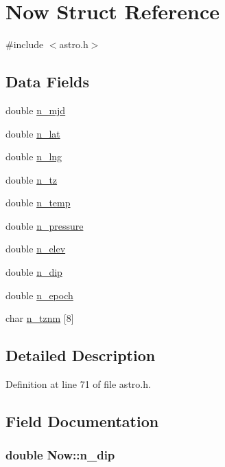 \hypertarget{struct_now}{\section{Now Struct Reference}
\label{struct_now}
}


{\ttfamily \#include $<$astro.\-h$>$}

\subsection*{Data Fields}
\begin{DoxyCompactItemize}
\item 
double \hyperlink{struct_now_ae44989148c84e000810e7e8a4ef80ef3}{n\-\_\-mjd}
\item 
double \hyperlink{struct_now_aa5502c245b6c3692923dcd93d63dcda7}{n\-\_\-lat}
\item 
double \hyperlink{struct_now_ae87a9736998420f40706b01a26f057aa}{n\-\_\-lng}
\item 
double \hyperlink{struct_now_a383e1839a265aa16a9559da5b6e7e466}{n\-\_\-tz}
\item 
double \hyperlink{struct_now_ab415bd78ad14170324c47fc33e6f20f7}{n\-\_\-temp}
\item 
double \hyperlink{struct_now_a53069a0946078dc8e2c74a24253d486a}{n\-\_\-pressure}
\item 
double \hyperlink{struct_now_a9254b6d4060e2fdb3e396e6db10140ac}{n\-\_\-elev}
\item 
double \hyperlink{struct_now_a2743cdcb18ceaf8a143c49199e047c86}{n\-\_\-dip}
\item 
double \hyperlink{struct_now_add842a99c3f0bc6c8ef59270715cbbfd}{n\-\_\-epoch}
\item 
char \hyperlink{struct_now_a4de7465879314c2183d60680531d7f8e}{n\-\_\-tznm} \mbox{[}8\mbox{]}
\end{DoxyCompactItemize}


\subsection{Detailed Description}


Definition at line 71 of file astro.\-h.



\subsection{Field Documentation}
\hypertarget{struct_now_a2743cdcb18ceaf8a143c49199e047c86}{
\subsubsection[{n\-\_\-dip}]{\setlength{\rightskip}{0pt plus 5cm}double Now\-::n\-\_\-dip}}\label{struct_now_a2743cdcb18ceaf8a143c49199e047c86}


